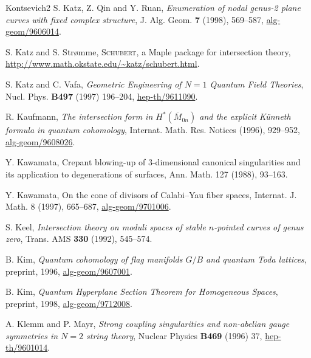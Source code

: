 \begin{thebibliography}{Kontsevich2}
\hypertarget{bib:KQR}{} S. Katz, Z. Qin and Y. Ruan, \emph{Enumeration of nodal genus-2 plane curves with fixed complex structure}, J. Alg. Geom. \textbf{7} (1998), 569--587, \href{https://arxiv.org/abs/alg-geom/9606014}{alg-geom/9606014}.

\hypertarget{bib:KaS}{} S. Katz and S. Strømme, \textsc{Schubert}, a Maple package for intersection theory, \url{http://www.math.okstate.edu/~katz/schubert.html}.

\hypertarget{bib:KV}{} S. Katz and C. Vafa, \emph{Geometric Engineering of $N=1$ Quantum Field Theories}, Nucl. Phys. \textbf{B497} (1997) 196--204, \href{https://arxiv.org/abs/hep-th/9611090}{hep-th/9611090}.

\hypertarget{bib:Kaufmann}{} R. Kaufmann, \emph{The intersection form in $H^*(\overline M_{0n})$ and the explicit Künneth formula in quantum cohomology}, Internat. Math. Res. Notices (1996), 929--952, \href{https://arxiv.org/abs/alg-geom/9608026}{alg-geom/9608026}.

\hypertarget{bib:Kawamata1}{}
Y. Kawamata, Crepant blowing-up of 3-dimensional canonical singularities and its application to degenerations of surfaces, Ann. Math. 127 (1988), 93--163.

\hypertarget{bib:Kawamata2}{}
Y. Kawamata, On the cone of divisors of Calabi--Yau fiber spaces, Internat. J. Math. 8 (1997), 665--687, \href{https://arxiv.org/abs/alg-geom/9701006}{alg-geom/9701006}.

\hypertarget{bib:Keel}{} S. Keel, \emph{Intersection theory on moduli spaces of stable $n$-pointed curves of genus zero}, Trans. AMS \textbf{330} (1992), 545--574.

\hypertarget{bib:Kim1}{} B. Kim, \emph{Quantum cohomology of flag manifolds $G/B$ and quantum Toda lattices}, preprint, 1996, \href{https://arxiv.org/abs/alg-geom/9607001}{alg-geom/9607001}.

\hypertarget{bib:Kim2}{}
B. Kim, \emph{Quantum Hyperplane Section Theorem for Homogeneous Spaces}, preprint, 1998, \href{https://arxiv.org/abs/alg-geom/9712008}{alg-geom/9712008}.

\hypertarget{bib:KlM}{} A. Klemm and P. Mayr, \emph{Strong coupling singularities and non-abelian gauge symmetries in $N=2$ string theory}, Nuclear Physics \textbf{B469} (1996) 37, \href{https://arxiv.org/abs/hep-th/9601014}{hep-th/9601014}.


\end{thebibliography}

